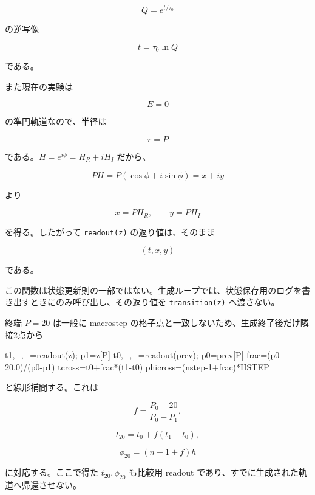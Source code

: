 \documentclass[
  a4paper,
]{ltjsarticle}
\newenvironment{Shaded}{}{}
\newcommand{\DecValTok}[1]{\textcolor[rgb]{0.25,0.63,0.44}{#1}}
\newcommand{\FloatTok}[1]{\textcolor[rgb]{0.25,0.63,0.44}{#1}}
\newcommand{\NormalTok}[1]{#1}
\newcommand{\OperatorTok}[1]{\textcolor[rgb]{0.40,0.40,0.40}{#1}}
\begin{document}
\[
Q=e^{t/\tau_0}
\]

の逆写像

\[
\boxed{
t=\tau_0\ln Q}
\]

である。

また現在の実験は

\[
E=0
\]

の準円軌道なので、半径は

\[
r=P
\]

である。\(H=e^{i\phi}=H_R+iH_I\) だから、

\[
PH
=
P(\cos\phi+i\sin\phi)
=
x+iy
\]

より

\[
\boxed{
x=P H_R,
\qquad
y=P H_I}
\]

を得る。したがって \texttt{readout(z)} の返り値は、そのまま

\[
(t,x,y)
\]

である。

この関数は状態更新則の一部ではない。生成ループでは、状態保存用のログを書き出すときにのみ呼び出し、その返り値を
\texttt{transition(z)} へ渡さない。

終端 \(P=20\) は一般に macrostep
の格子点と一致しないため、生成終了後だけ隣接2点から

\begin{Shaded}
\begin{Highlighting}[]
\NormalTok{t1,\_,\_}\OperatorTok{=}\NormalTok{readout(z)}\OperatorTok{;}\NormalTok{ p1}\OperatorTok{=}\NormalTok{z[P]}
\NormalTok{t0,\_,\_}\OperatorTok{=}\NormalTok{readout(prev)}\OperatorTok{;}\NormalTok{ p0}\OperatorTok{=}\NormalTok{prev[P]}
\NormalTok{frac}\OperatorTok{=}\NormalTok{(p0}\OperatorTok{{-}}\FloatTok{20.0}\NormalTok{)}\OperatorTok{/}\NormalTok{(p0}\OperatorTok{{-}}\NormalTok{p1)}
\NormalTok{tcross}\OperatorTok{=}\NormalTok{t0}\OperatorTok{+}\NormalTok{frac}\OperatorTok{*}\NormalTok{(t1}\OperatorTok{{-}}\NormalTok{t0)}
\NormalTok{phicross}\OperatorTok{=}\NormalTok{(nstep}\OperatorTok{{-}}\DecValTok{1}\OperatorTok{+}\NormalTok{frac)}\OperatorTok{*}\NormalTok{HSTEP}
\end{Highlighting}
\end{Shaded}

と線形補間する。これは

\[
f
=
\frac{P_0-20}{P_0-P_1},
\]

\[
t_{20}=t_0+f(t_1-t_0),
\]

\[
\phi_{20}=(n-1+f)h
\]

に対応する。ここで得た \(t_{20},\phi_{20}\) も比較用 readout
であり、すでに生成された軌道へ帰還させない。
\end{document}
